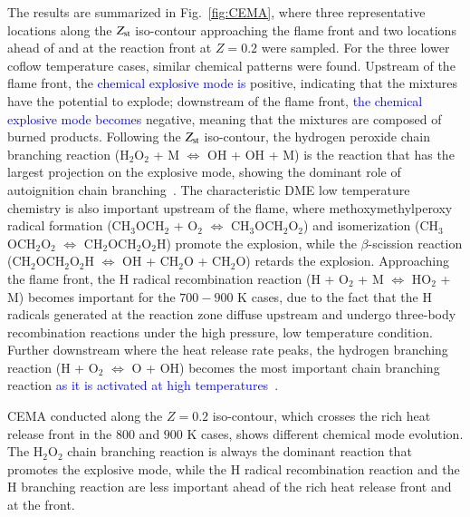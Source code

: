 \documentclass[review,3p,times]{elsarticle}
\begin{document}
The results are summarized in Fig.~\ref{fig:CEMA}, where three representative locations along the $Z_{\rm st}$ iso-contour approaching the flame front and two locations ahead of and at the reaction front at $Z = 0.2$ were sampled.  For the three lower coflow temperature cases, similar chemical patterns were found.  Upstream of the flame front, the \textcolor{blue}{chemical explosive mode is} positive, indicating that the mixtures have the potential to explode; downstream of the flame front, \textcolor{blue}{the chemical explosive mode becomes} negative, meaning that the mixtures are composed of burned products.  Following the $Z_{\rm st}$ iso-contour, the hydrogen peroxide chain branching reaction (H$_2$O$_2$ + M $\Longleftrightarrow$ OH + OH + M) is the reaction that has the largest projection on the explosive mode, showing the dominant role of autoignition chain branching\textcolor{blue}{~\cite{westbrook00}}.  The characteristic DME low temperature chemistry is also important upstream of the flame, where methoxymethylperoxy radical formation (CH$_3$OCH$_2$ + O$_2$ $\Longleftrightarrow$ CH$_3$OCH$_2$O$_2$) and isomerization (CH$_3$OCH$_2$O$_2$ $\Longleftrightarrow$ CH$_2$OCH$_2$O$_2$H) promote the explosion, while the $\beta$-scission reaction (CH$_2$OCH$_2$O$_2$H $\Longleftrightarrow$ OH + CH$_2$O + CH$_2$O) retards the explosion.  Approaching the flame front, the H radical recombination reaction (H + O$_2$ + M $\Longleftrightarrow$ HO$_2$ + M) becomes important for the $700-900$ K cases, due to the fact that the H radicals generated at the reaction zone diffuse upstream and undergo three-body recombination reactions under the high pressure, low temperature condition.  Further downstream where the heat release rate peaks, the hydrogen branching reaction (H + O$_2$ $\Longleftrightarrow$ O + OH) becomes the most important chain branching reaction \textcolor{blue}{as it is activated at high temperatures~\cite{westbrook00}.}


CEMA conducted along the $Z = 0.2$ iso-contour, which crosses the rich heat release front in the $800$ and $900$ K cases, shows different chemical mode evolution.  The H$_2$O$_2$ chain branching reaction is always the dominant reaction that promotes the explosive mode, while the H radical recombination reaction and the H branching reaction are less important ahead of the rich heat release front and at the front.  
\end{document}
